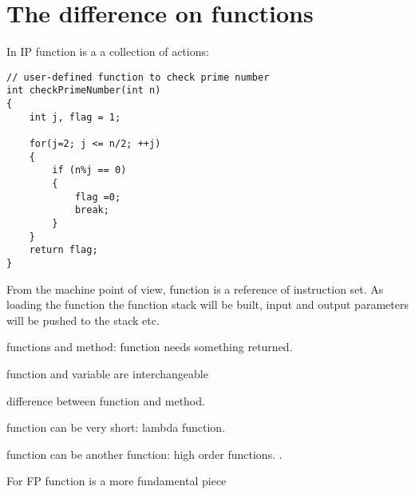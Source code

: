 \documentclass[notheorems, aspectratio=54]{beamer}
\begin{document}
\section{The difference on functions}
\begin{frame}[fragile]
  
\begin{block}{In IP function is a a collection of actions:}
\begin{verbatim}
// user-defined function to check prime number
int checkPrimeNumber(int n)
{
    int j, flag = 1;

    for(j=2; j <= n/2; ++j)
    {
        if (n%j == 0)
        {
            flag =0;
            break;
        }
    }
    return flag;
}   
\end{verbatim}   
\end{block}
From the machine point of view, function is a reference of instruction set. As
loading the function the function stack will be built, input and output parameters
will be pushed to the stack etc.
  
\end{frame}

\begin{frame}



\end{frame}

\begin{frame}

functions and method: function needs something returned.

function and variable are interchangeable

difference between function and method.

function can be very short: lambda function.

function can be another function: high order functions.
. 
\begin{block}{For FP function is a more fundamental piece}
 
\end{block}

  
\end{frame}


\end{document}
